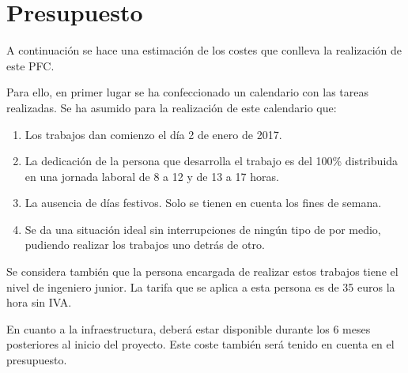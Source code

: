 \chapter*{Presupuesto}

A continuación se hace una estimación de los costes que conlleva la realización de este \gls{PFC}.

Para ello, en primer lugar se ha confeccionado un calendario con las tareas realizadas. Se ha asumido para la realización de este calendario que:

\begin{enumerate}
  \item Los trabajos dan comienzo el día 2 de enero de 2017.
  \item La dedicación de la persona que desarrolla el trabajo es del 100\% distribuida en una jornada laboral de 8 a 12 y de 13 a 17 horas.
  \item La ausencia de días festivos. Solo se tienen en cuenta los fines de semana.
  \item Se da una situación ideal sin interrupciones de ningún tipo de por medio, pudiendo realizar los trabajos uno detrás de otro.
\end{enumerate}

Se considera también que la persona encargada de realizar estos trabajos tiene el nivel de ingeniero junior. La tarifa que se aplica a esta persona es de 35 euros la hora sin IVA.

En cuanto a la infraestructura, deberá estar disponible durante los 6 meses posteriores al inicio del proyecto. Este coste también será tenido en cuenta en el presupuesto.



